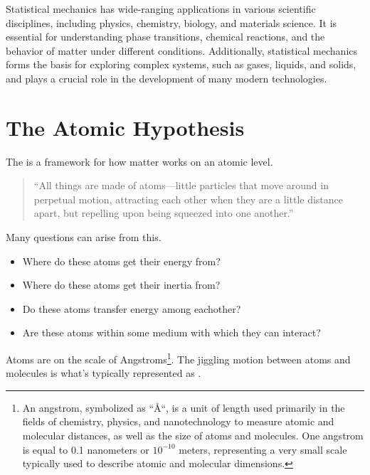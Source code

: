 Statistical mechanics has wide-ranging applications in various scientific disciplines, including physics, chemistry, biology, and materials science. It is essential for understanding phase transitions, chemical reactions, and the behavior of matter under different conditions. Additionally, statistical mechanics forms the basis for exploring complex systems, such as gases, liquids, and solids, and plays a crucial role in the development of many modern technologies.

\section{The Atomic Hypothesis}

The  is a framework for how matter works on an atomic level.

\begin{quotation}
	``All things are made of atoms—little particles that move around in perpetual motion, attracting each other when they are a little distance apart, but repelling upon being squeezed into one another.''
\end{quotation}

Many questions can arise from this.

\begin{itemize}
	\item Where do these atoms get their energy from?
 	\item Where do these atoms get their inertia from?
  	\item Do these atoms transfer energy among eachother?
   	\item Are these atoms within some medium with which they can interact?
\end{itemize}

Atoms are on the scale of Angstroms\footnote{An angstrom, symbolized as ``\AA``, is a unit of length used primarily in the fields of chemistry, physics, and nanotechnology to measure atomic and molecular distances, as well as the size of atoms and molecules. One angstrom is equal to 0.1 nanometers or $10^{-10}$ meters, representing a very small scale typically used to describe atomic and molecular dimensions.}. The jiggling motion between atoms and molecules is what's typically represented as . 
